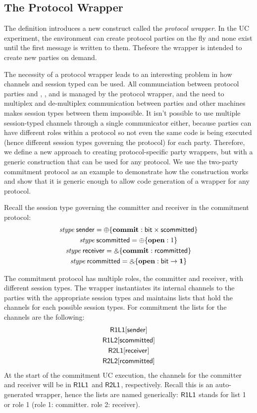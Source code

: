 \subsection{The Protocol Wrapper}
The  definition introduces a new construct called the \textit{protocol wrapper}. 
In the UC experiment, the environment can create protocol parties on the fly and none exist until the first message is written to them.
Thefeore the wrapper is intended to create new parties on demand.

The necessity of a protocol wrapper leads to an interesting problem in how channels and session typed can be used.
All communciation between protocol parties and \Environment, \F, and \Adversary is managed by the protocol wrapper, and the need to multiplex and de-multiplex communication between parties and other machines makes session types between them impossible.
It isn't possible to use multiple session-typed channels through a single communicator either, because parties can have different roles within a protocol so not even the same code is being executed (hence different session types governing the protocol) for each party.
Therefore, we define a new approach to creating protocol-specific party wrappers, but with a generic construction that can be used for any protocol.
We use the two-party commitment protocol as an example to demonstrate how the construction works and show that it is generic enough to allow code generation of a wrapper for any protocol.

Recall the session type governing the committer and receiver in the commitment protocol:
\begin{gather}
	\mbox{\it stype} \; \mathsf{sender} = \oplus \{ \mathbf{commit} : \mathsf{bit} \times \mathsf{scommitted} \} \\
	\mbox{\it stype} \; \mathsf{scommitted} = \oplus \{ \mathbf{open} : 1 \} \\
	\mbox{\it stype} \; \mathsf{receiver} = \mathbin{\binampersand} \{ \mathbf{commit} : \mathsf{rcommitted} \} \\
	\mbox{\it stype} \; \mathsf{rcommitted} = \mathbin{\binampersand} \{ \mathbf{open} : \mathsf{bit} \rightarrow \mathbf{1} \}
\end{gather}

The commitment protocol has multiple roles, the committer and receiver, with different session types. 
The wrapper instantiates its internal channels to the parties with the appropriate session types and maintains lists that hold the channels for each possible session types.
For commitment the lists for the  channels are the following:
\begin{gather}
	\mathsf{R1L1}[\mathsf{sender}] \\
	\mathsf{R1L2}[\mathsf{scommitted}] \\
	\mathsf{R2L1}[\mathsf{receiver}] \\
	\mathsf{R2L2}[\mathsf{rcommitted}] 
\end{gather}
At the start of the commitment UC execution, the  channels for the committer and receiver will be in ${\mathsf {R1L1}}$ and ${\mathsf {R2L1}}$, respectively.
Recall this is an auto-generated wrapper, hence the lists are named generically: ${\mathsf {R1L1}}$ stands for list 1 or role 1 (role 1: committer. role 2: receiver). 

